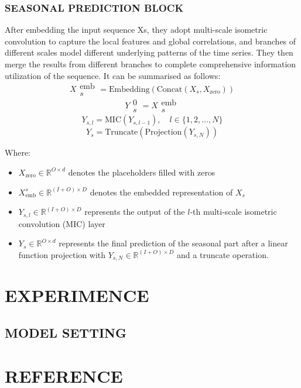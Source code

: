 \documentclass[conference]{IEEEtran}
\begin{document}
\subsubsection{SEASONAL PREDICTION BLOCK}
After embedding the input sequence Xs, they adopt multi-scale isometric convolution to capture the local features and global correlations, and branches of different scales model different underlying patterns of the time series. They then merge the results from different branches to complete comprehensive information utilization of the sequence. It can be summarised as follows:
\[X{\substack{\text{emb}\\s}}{} = {\text{Embedding}}(\text{Concat}(X_s, X_{\text{zero}}))\]
\[Y{\substack{\text{0}\\s}}{} = X{\substack{\text{emb}\\s}}{}\]
\[Y_{s,l} = \text{MIC}(Y_{s,l-1}), \quad l \in \{1, 2, \ldots, N\}\]
\[Y_s = \text{Truncate}(\text{Projection}(Y_{s,N}))\]

Where:
\begin{itemize}
    \item \(X_{\text{zero}} \in \mathbb{R}^{O \times d}\) denotes the placeholders filled with zeros
    \item \(X_{\text{emb}}^s \in \mathbb{R}^{(I+O) \times D}\) denotes the embedded representation of \(X_s\)
    \item \(Y_{s,l} \in \mathbb{R}^{(I+O) \times D}\) represents the output of the \(l\)-th multi-scale isometric convolution (MIC) layer
    \item \(Y_s \in \mathbb{R}^{O \times d}\) represents the final prediction of the seasonal part after a linear function projection with \(Y_{s,N} \in \mathbb{R}^{(I+O) \times D}\) and a truncate operation.
\end{itemize}


\section{EXPERIMENCE}
\subsection{MODEL SETTING}

\section{REFERENCE}

\printbibliography

\vspace{12pt}
\end{document}
